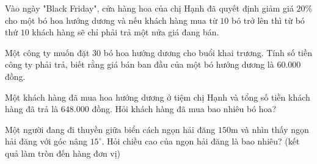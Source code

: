 \begin{bt}%
Vào ngày "Black Friday", cửa hàng hoa của chị Hạnh đã quyết định giảm giá $20\%$ cho một bó hoa hướng dương và nếu khách hàng mua từ $10$ bó trở lên thì từ bó thứ $10$ khách hàng sẽ chỉ phải trả một nửa giá đang bán.
\begin{listEX}
\item Một công ty muốn đặt $30$ bó hoa hướng dương cho buổi khai trương. Tính số tiền công ty phải trả, biết rằng giá bán ban đầu của một bó hướng dương là $60.000$ đồng.
\item Một khách hàng đã mua hoa hướng dương ở tiệm chị Hạnh và tổng số tiền khách hàng đã trả là $648.000$ đồng. Hỏi khách hàng đã mua bao nhiêu bó hoa?
\end{listEX}
\end{bt}

\begin{bt}%
Một người đang đi thuyền giữa biển cách ngọn hải đăng $150$m và nhìn thấy ngọn hải đăng với góc nâng $15^\circ$. Hỏi chiều cao của ngọn hải đăng là bao nhiêu? (kết quả làm tròn đến hàng đơn vị)
\end{bt}


